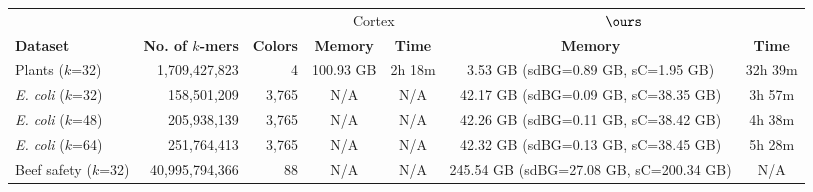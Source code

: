 \begin{mytable}
  \caption{Comparison between the peak memory and time usage required to store all the $k$-mers and run bubble calling on the data in {\sc Cortex} and $\ours$.
    The peak memory is given in megabytes (MB) or gigabytes (GB). The running time is reported in seconds (s), minutes (m), and hours (h).  The succinct de Bruijn graph and compressed color matrix components of the memory footprint are listed in parenthesis as sdBG and sC, respectively.}
 \label{tbl-cosmo}
 \scriptsize
 \setlength\tabcolsep{3pt}
  \centering
  \begin{tabular}{@{}lrrcccc@{}}
   	\toprule
	\multicolumn{1}{l}{}
   	& \multicolumn{1}{r}{}	
	& \multicolumn{1}{r}{} 
	& \multicolumn{2}{c}{{\sc Cortex}} 
	& \multicolumn{2}{c}{$\ours$}  \\
	\cmidrule(lr){4-5}\cmidrule(l){6-7}
        {\bf Dataset} & {\bf\boldmath No. of $k$-mers} & {\bf Colors} & {\bf Memory} & {\bf Time} & {\bf Memory} & {\bf Time} \\
	\midrule
	Plants	($k$=32)				& 1,709,427,823 	& 4 	& 100.93 GB 	& 2h 18m	& 3.53 GB (sdBG=0.89 GB, sC=1.95 GB) 	& 32h 39m \\
     \emph{E. coli}  ($k$=32)         & 158,501,209       & 3,765 & N/A        & N/A      &  42.17 GB (sdBG=0.09 GB, sC=38.35 GB)     & 3h 57m  \\
     \emph{E. coli}  ($k$=48)         & 205,938,139       & 3,765 & N/A        & N/A      &  42.26 GB (sdBG=0.11 GB, sC=38.42 GB)     & 4h 38m  \\
     \emph{E. coli}  ($k$=64)         & 251,764,413       & 3,765 & N/A        & N/A      &  42.32 GB (sdBG=0.13 GB, sC=38.45 GB)     & 5h 28m  \\
    Beef safety ($k$=32)                            & 40,995,794,366    & 88    & N/A        & N/A   & 245.54 GB (sdBG=27.08 GB, sC=200.34 GB)     & N/A \\
 	\bottomrule
	\end{tabular}
\end{mytable}


\subsection{}

